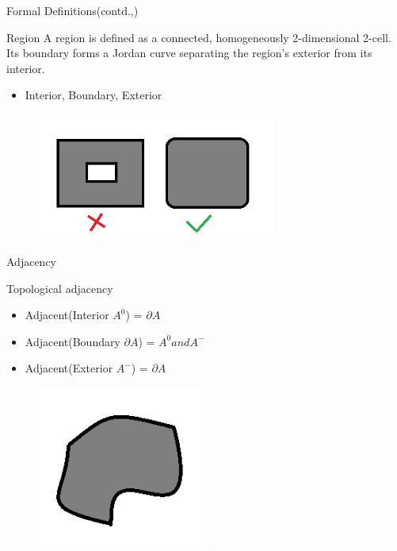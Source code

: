 \begin{frame}{Formal Definitions(contd.,)}
	\begin{block}{Region}
	A region is defined as a connected, homogeneously 2-dimensional 2-cell. Its boundary forms a Jordan curve separating the region's exterior from its interior.
	\begin{itemize}
	\item Interior, Boundary, Exterior
	\end{itemize}
\end{block}		
		\begin{figure}
		\includegraphics[width=0.7\textwidth]{images/region.png}
\end{figure}
\end{frame}

\begin{frame}{Adjacency}
	\begin{block}{Topological adjacency}
	\begin{itemize}
	\item Adjacent(Interior {$A^0$}) = $\partial A$
	\item Adjacent(Boundary {$\partial A$}) = $A^0 and A^-$
	\item Adjacent(Exterior {$A^-$}) = $\partial A$
	\end{itemize}
	\begin{figure}
	\includegraphics[width = 0.5\textwidth]{images/adjacency.png}
	\end{figure}
\end{block}		
\end{frame}

